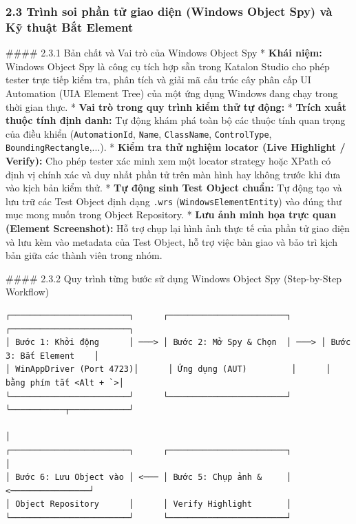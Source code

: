 \subsubsection{2.3 Trình soi phần tử giao diện (Windows Object Spy) và Kỹ thuật Bắt Element}

#### 2.3.1 Bản chất và Vai trò của Windows Object Spy
* \textbf{Khái niệm:} Windows Object Spy là công cụ tích hợp sẵn trong Katalon Studio cho phép tester trực tiếp kiểm tra, phân tích và giải mã cấu trúc cây phân cấp UI Automation (UIA Element Tree) của một ứng dụng Windows đang chạy trong thời gian thực.
* \textbf{Vai trò trong quy trình kiểm thử tự động:}
  * \textbf{Trích xuất thuộc tính định danh:} Tự động khám phá toàn bộ các thuộc tính quan trọng của điều khiển (\texttt{AutomationId}, \texttt{Name}, \texttt{ClassName}, \texttt{ControlType}, \texttt{BoundingRectangle},...).
  * \textbf{Kiểm tra thử nghiệm locator (Live Highlight / Verify):} Cho phép tester xác minh xem một locator strategy hoặc XPath có định vị chính xác và duy nhất phần tử trên màn hình hay không trước khi đưa vào kịch bản kiểm thử.
  * \textbf{Tự động sinh Test Object chuẩn:} Tự động tạo và lưu trữ các Test Object định dạng \texttt{.wrs} (\texttt{WindowsElementEntity}) vào đúng thư mục mong muốn trong Object Repository.
  * \textbf{Lưu ảnh minh họa trực quan (Element Screenshot):} Hỗ trợ chụp lại hình ảnh thực tế của phần tử giao diện và lưu kèm vào metadata của Test Object, hỗ trợ việc bàn giao và bảo trì kịch bản giữa các thành viên trong nhóm.

#### 2.3.2 Quy trình từng bước sử dụng Windows Object Spy (Step-by-Step Workflow)

\begin{lstlisting}
┌────────────────────────┐      ┌────────────────────────┐      ┌────────────────────────┐
│ Bước 1: Khởi động      │ ───> │ Bước 2: Mở Spy & Chọn  │ ───> │ Bước 3: Bắt Element    │
│ WinAppDriver (Port 4723)│      │ Ứng dụng (AUT)         │      │ bằng phím tắt <Alt + `>│
└────────────────────────┘      └────────────────────────┘      └───────────┬────────────┘
                                                                            │
┌────────────────────────┐      ┌────────────────────────┐                  │
│ Bước 6: Lưu Object vào │ <─── │ Bước 5: Chụp ảnh &     │ <────────────────┘
│ Object Repository      │      │ Verify Highlight       │
└────────────────────────┘      └────────────────────────┘
\end{lstlisting}


